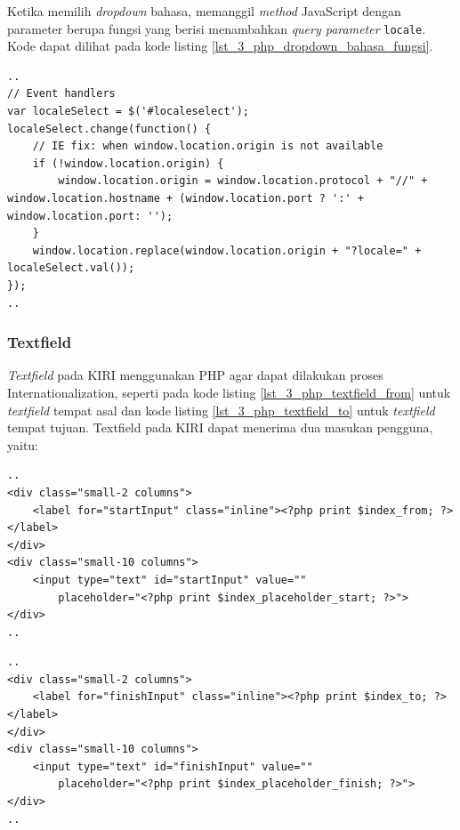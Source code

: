 Ketika memilih \textit{dropdown} bahasa, memanggil \textit{method} JavaScript dengan parameter berupa fungsi yang berisi menambahkan \textit{query parameter} \verb!locale!. Kode dapat dilihat pada kode listing \ref{lst_3_php_dropdown_bahasa_fungsi}.

\begin{lstlisting}[caption=Fungsi JavaScript untuk Internationalization ,label = {lst_3_php_dropdown_bahasa_fungsi}]
..
// Event handlers
var localeSelect = $('#localeselect');
localeSelect.change(function() {
	// IE fix: when window.location.origin is not available 
	if (!window.location.origin) {
		window.location.origin = window.location.protocol + "//" + window.location.hostname + (window.location.port ? ':' + window.location.port: '');
	}
	window.location.replace(window.location.origin + "?locale=" + localeSelect.val());
});
..
\end{lstlisting}


\subsubsection{Textfield}
\textit{Textfield} pada KIRI menggunakan PHP agar dapat dilakukan proses Internationalization, seperti pada kode listing \ref{lst_3_php_textfield_from} untuk \textit{textfield} tempat asal dan kode listing \ref{lst_3_php_textfield_to} untuk \textit{textfield} tempat tujuan. Textfield pada KIRI dapat menerima dua masukan pengguna, yaitu:

\begin{lstlisting}[caption=Menampilkan \textit{textfield} tempat awal kepada pengguna ,label = {lst_3_php_textfield_from}]
..
<div class="small-2 columns">
	<label for="startInput" class="inline"><?php print $index_from; ?></label>
</div>
<div class="small-10 columns">
	<input type="text" id="startInput" value=""
		placeholder="<?php print $index_placeholder_start; ?>">
</div>
..
\end{lstlisting}

\begin{lstlisting}[caption=Menampilkan \textit{textfield} tempat tujuan kepada pengguna ,label = {lst_3_php_textfield_to}]
..
<div class="small-2 columns">
	<label for="finishInput" class="inline"><?php print $index_to; ?></label>
</div>
<div class="small-10 columns">
	<input type="text" id="finishInput" value=""
		placeholder="<?php print $index_placeholder_finish; ?>">
</div>
..
\end{lstlisting}

